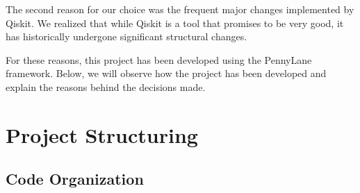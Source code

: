 The second reason for our choice was the frequent major changes implemented by Qiskit. We realized that while Qiskit is a tool that promises to be very good, it has historically undergone significant structural changes.

For these reasons, this project has been developed using the PennyLane framework. Below, we will observe how the project has been developed and explain the reasons behind the decisions made.

\section{Project Structuring}

\subsection{Code Organization}
